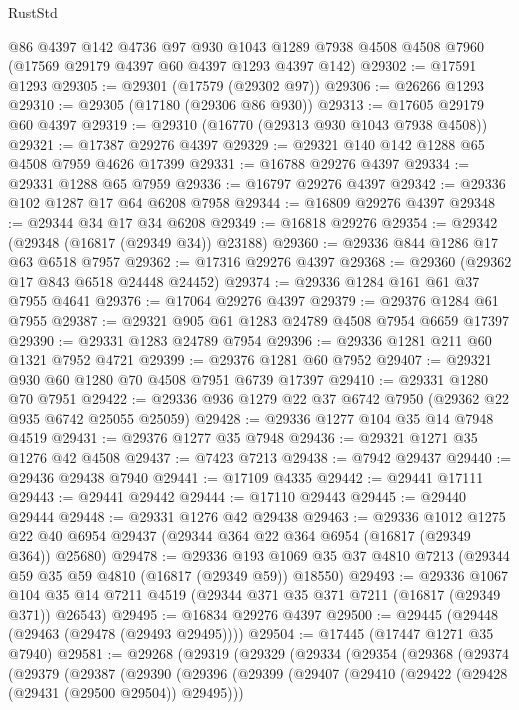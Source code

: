 \begin{lexlean}{RustStd}
\begin{coremodule}
    @86
    @4397
    @142
    @4736
    @97
    @930
    @1043
    @1289
    @7938
    @4508
    @4508
    @7960
    (@17569 @29179 @4397 @60 @4397 @1293 @4397 @142)
@29302 := @17591 @1293
@29305 := @29301 (@17579 (@29302 @97))
@29306 := @26266 @1293
@29310 := @29305 (@17180 (@29306 @86 @930))
@29313 := @17605 @29179 @60 @4397
@29319 := @29310 (@16770 (@29313 @930 @1043 @7938 @4508))
@29321 := @17387 @29276 @4397
@29329 := @29321 @140 @142 @1288 @65 @4508 @7959 @4626 @17399
@29331 := @16788 @29276 @4397
@29334 := @29331 @1288 @65 @7959
@29336 := @16797 @29276 @4397
@29342 := @29336 @102 @1287 @17 @64 @6208 @7958
@29344 := @16809 @29276 @4397
@29348 := @29344 @34 @17 @34 @6208
@29349 := @16818 @29276
@29354 := @29342 (@29348 (@16817 (@29349 @34)) @23188)
@29360 := @29336 @844 @1286 @17 @63 @6518 @7957
@29362 := @17316 @29276 @4397
@29368 := @29360 (@29362 @17 @843 @6518 @24448 @24452)
@29374 := @29336 @1284 @161 @61 @37 @7955 @4641
@29376 := @17064 @29276 @4397
@29379 := @29376 @1284 @61 @7955
@29387 := @29321 @905 @61 @1283 @24789 @4508 @7954 @6659 @17397
@29390 := @29331 @1283 @24789 @7954
@29396 := @29336 @1281 @211 @60 @1321 @7952 @4721
@29399 := @29376 @1281 @60 @7952
@29407 := @29321 @930 @60 @1280 @70 @4508 @7951 @6739 @17397
@29410 := @29331 @1280 @70 @7951
@29422 := @29336 @936 @1279 @22 @37 @6742 @7950 (@29362 @22 @935 @6742 @25055 @25059)
@29428 := @29336 @1277 @104 @35 @14 @7948 @4519
@29431 := @29376 @1277 @35 @7948
@29436 := @29321 @1271 @35 @1276 @42 @4508
@29437 := @7423 @7213
@29438 := @7942 @29437
@29440 := @29436 @29438 @7940
@29441 := @17109 @4335
@29442 := @29441 @17111
@29443 := @29441 @29442
@29444 := @17110 @29443
@29445 := @29440 @29444
@29448 := @29331 @1276 @42 @29438
@29463 := @29336
    @1012
    @1275
    @22
    @40
    @6954
    @29437
    (@29344 @364 @22 @364 @6954 (@16817 (@29349 @364)) @25680)
@29478 := @29336
    @193
    @1069
    @35
    @37
    @4810
    @7213
    (@29344 @59 @35 @59 @4810 (@16817 (@29349 @59)) @18550)
@29493 := @29336
    @1067
    @104
    @35
    @14
    @7211
    @4519
    (@29344 @371 @35 @371 @7211 (@16817 (@29349 @371)) @26543)
@29495 := @16834 @29276 @4397
@29500 := @29445 (@29448 (@29463 (@29478 (@29493 @29495))))
@29504 := @17445 (@17447 @1271 @35 @7940)
@29581 := @29268
    (@29319
      (@29329
        (@29334
          (@29354
            (@29368
              (@29374
                (@29379
                  (@29387
                    (@29390
                      (@29396
                        (@29399
                          (@29407
                            (@29410 (@29422 (@29428 (@29431 (@29500 @29504)) @29495)))

\end{coremodule}
\end{lexlean}
